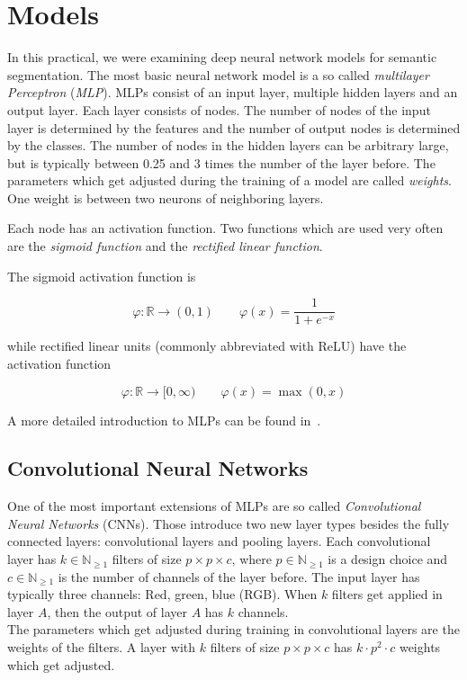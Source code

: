 
\section{Models}

In this practical, we were examining deep neural network models for semantic
segmentation. The most basic neural network model is a so called
\textit{multilayer Perceptron} (\textit{MLP}). MLPs consist of an input layer,
multiple hidden layers and an output layer. Each layer consists of nodes. The
number of nodes of the input layer is determined by the features and the number
of output nodes is determined by the classes. The number of nodes in the hidden
layers can be arbitrary large, but is typically between 0.25 and 3 times the
number of the layer before. The parameters which get adjusted during the
training of a model are called \textit{weights}. One weight is between two
neurons of neighboring layers.

Each node has an activation function. Two functions which are used very often
are the \textit{sigmoid function} and the \textit{rectified linear function}.

The sigmoid activation function is

\[\varphi: \mathbb{R} \rightarrow (0, 1) \qquad \varphi(x) = \frac{1}{1 + e^{-x}}\]

while rectified linear units (commonly abbreviated with ReLU) have the
activation function

\[\varphi: \mathbb{R} \rightarrow [0, \infty) \qquad \varphi(x) = \max(0, x)\]

A more detailed introduction to MLPs can be found in~\cite{Mitchell1997}.

\subsection{Convolutional Neural Networks}
One of the most important extensions of MLPs are so called
\textit{Convolutional Neural Networks} (CNNs). Those introduce two new layer types
besides the fully connected layers: convolutional layers and pooling layers.
Each convolutional layer has $k \in \mathbb{N}_{\geq 1}$ filters of size $p
\times p \times c$, where $p \in \mathbb{N}_{\geq 1}$ is a design choice and $c
\in \mathbb{N}_{\geq 1}$ is the number of channels of the layer before. The
input layer has typically three channels: Red, green, blue (RGB). When $k$
filters get applied in layer $A$, then the output of layer $A$ has $k$
channels.\\
The parameters which get adjusted during training in convolutional layers are
the weights of the filters. A layer with $k$ filters of size
$p \times p \times c$ has $k \cdot p^2 \cdot c$ weights which get adjusted.

